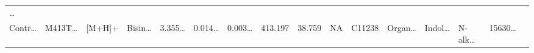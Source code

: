 \documentclass[
]{article}
\begin{document}
\begin{longtable}[]{@{}llllllllllllllll@{}}
\begin{minipage}[t]{0.02\columnwidth}
\ldots{}\strut
\end{minipage}\tabularnewline
\begin{minipage}[t]{0.04\columnwidth}\raggedright
Contr\ldots{}\strut
\end{minipage} & \begin{minipage}[t]{0.04\columnwidth}\raggedright
M413T\ldots{}\strut
\end{minipage} & \begin{minipage}[t]{0.04\columnwidth}\raggedright
{[}M+H{]}+\strut
\end{minipage} & \begin{minipage}[t]{0.04\columnwidth}\raggedright
Bisin\ldots{}\strut
\end{minipage} & \begin{minipage}[t]{0.04\columnwidth}\raggedright
3.355\ldots{}\strut
\end{minipage} & \begin{minipage}[t]{0.04\columnwidth}\raggedright
0.014\ldots{}\strut
\end{minipage} & \begin{minipage}[t]{0.04\columnwidth}\raggedright
0.003\ldots{}\strut
\end{minipage} & \begin{minipage}[t]{0.04\columnwidth}\raggedright
413.197\strut
\end{minipage} & \begin{minipage}[t]{0.04\columnwidth}\raggedright
38.759\strut
\end{minipage} & \begin{minipage}[t]{0.04\columnwidth}\raggedright
NA\strut
\end{minipage} & \begin{minipage}[t]{0.03\columnwidth}\raggedright
C11238\strut
\end{minipage} & \begin{minipage}[t]{0.04\columnwidth}\raggedright
Organ\ldots{}\strut
\end{minipage} & \begin{minipage}[t]{0.04\columnwidth}\raggedright
Indol\ldots{}\strut
\end{minipage} & \begin{minipage}[t]{0.04\columnwidth}\raggedright
N-alk\ldots{}\strut
\end{minipage} & \begin{minipage}[t]{0.04\columnwidth}\raggedright
15630\ldots{}\strut
\end{minipage} & \begin{minipage}[t]{0.02\columnwidth}\raggedright

\end{minipage}
\end{longtable}
\end{document}
